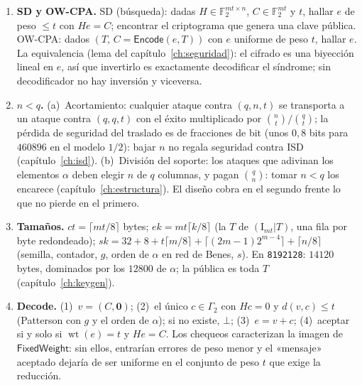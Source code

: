 \documentclass[11pt,a4paper,oneside]{report}
\newcommand{\F}{\mathbb{F}}
\newcommand{\wt}{\operatorname{wt}}
\newcommand{\Ftwo}{\F_2}
\begin{document}
\begin{enumerate}[leftmargin=1.9em,itemsep=5pt]
  \item \textbf{SD y OW-CPA.} SD (búsqueda): dadas $H\in\Ftwo^{mt
        \times n}$, $C\in\Ftwo^{mt}$ y $t$, hallar $e$ de peso
        $\le t$ con $He=C$; encontrar el criptograma que genera
        una clave pública. OW-CPA: dados $(T,\,C=\textsf{Encode}(e,T))$
        con $e$ uniforme de peso $t$, hallar $e$. La
        equivalencia (lema del capítulo~\ref{ch:seguridad}): el
        cifrado es una biyección lineal en $e$, así que invertirlo
        es exactamente decodificar el síndrome; sin decodificador
        no hay inversión y viceversa.

  \item \textbf{$n<q$.} (a)~Acortamiento: cualquier ataque contra
        $(q,n,t)$ se transporta a un ataque contra $(q,q,t)$ con el
        éxito multiplicado por $\binom{n}{t}/\binom{q}{t}$; la pérdida
        de seguridad del traslado es de fracciones de bit (unos
        $0{,}8$ bits para $460896$ en el modelo $1/2$): bajar $n$ no
        regala seguridad contra ISD
        (capítulo~\ref{ch:isd}). (b)~División del soporte: los
        ataques que adivinan los elementos $\alpha$ deben elegir
        $n$ de $q$ columnas, y pagan $\binom{q}{n}$: tomar
        $n<q$ los encarece (capítulo~\ref{ch:estructura}). El
        diseño cobra en el segundo frente lo que no pierde en el
        primero.

  \item \textbf{Tamaños.} $ct=\lceil mt/8\rceil$ bytes;
        $ek=mt\lceil k/8\rceil$ (la $T$ de
        $(\mathrm{I}_{mt}|T)$, una fila por byte redondeado);
        $sk=32+8+t\lceil m/8\rceil+\lceil(2m-1)2^{m-4}\rceil
        +\lceil n/8\rceil$ (semilla, contador, $g$, orden de
        $\alpha$ en red de Benes, $s$). En \texttt{8192128}:
        $14120$ bytes, dominados por los $12800$ de $\alpha$;
        la pública es toda $T$ (capítulo~\ref{ch:keygen}).

  \item \textbf{Decode.} (1)~$v=(C,\mathbf{0})$; (2)~el único
        $c\in\Gamma_2$ con $Hc=0$ y $d(v,c)\le t$ (Patterson con
        $g$ y el orden de $\alpha$); si no existe, $\bot$;
        (3)~$e=v+c$; (4)~aceptar si y solo si $\wt(e)=t$ y
        $He=C$. Los chequeos caracterizan la imagen de
        $\textsf{FixedWeight}$: sin ellos, entrarían errores de
        peso menor y el «mensaje» aceptado dejaría de ser uniforme en
        el conjunto de peso $t$ que exige la reducción.


\end{enumerate}
\end{document}

